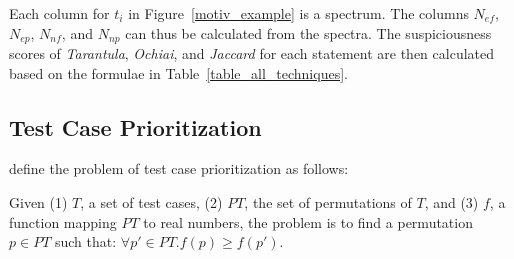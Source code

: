  Each column for $t_{i}$ in Figure~\ref{motiv_example} is a spectrum. The columns $N_{ef}$, $N_{ep}$, $N_{nf}$, and $N_{np}$ can thus be calculated from the spectra.
The suspiciousness scores of {\em Tarantula}, {\em Ochiai}, and {\em Jaccard} for each statement are then calculated based on the formulae in Table~\ref{table_all_techniques}.


%
%


\subsection{Test Case Prioritization}\label{sec.prelim.test_prior}

\cite{RUCH01} define the problem of test case prioritization  as follows:

\begin{definition}
Given
(1) $T$, a set of test cases, (2) $PT$, the set of permutations of $T$, and (3) $f$, a function mapping $PT$ to real numbers, the problem is to find a permutation $p \in PT$ such that:
	$\forall{p' \in PT}. f(p) \geq f(p')$.
\end{definition}

